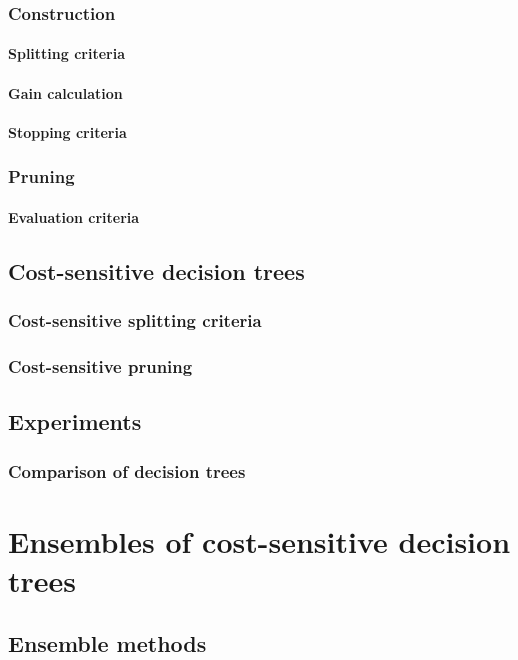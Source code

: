 \documentclass[twoside,openright,titlepage,numbers=noenddot,headinclude,%
               footinclude=true,cleardoublepage=empty,abstractoff,BCOR=5mm,%
               paper=a4,fontsize=11pt,ngerman,american]{scrreprt}
\numberwithin{theorem}{chapter}
\numberwithin{definition}{chapter}
\numberwithin{algorithm}{chapter}
\numberwithin{figure}{chapter}
\numberwithin{table}{chapter}
\numberwithin{equation}{chapter}
\begin{document}
			\subsection{Construction}
				\subsubsection{Splitting criteria}
				\subsubsection{Gain calculation}
				\subsubsection{Stopping criteria}
			\subsection{Pruning}
				\subsubsection{Evaluation criteria}
		\section{Cost-sensitive decision trees}
			\subsection{Cost-sensitive splitting criteria}
			\subsection{Cost-sensitive pruning}
		\section{Experiments}
			\subsection{Comparison of decision trees}
		
	\chapter{Ensembles of cost-sensitive decision trees}
		\section{Ensemble methods}
\end{document}
